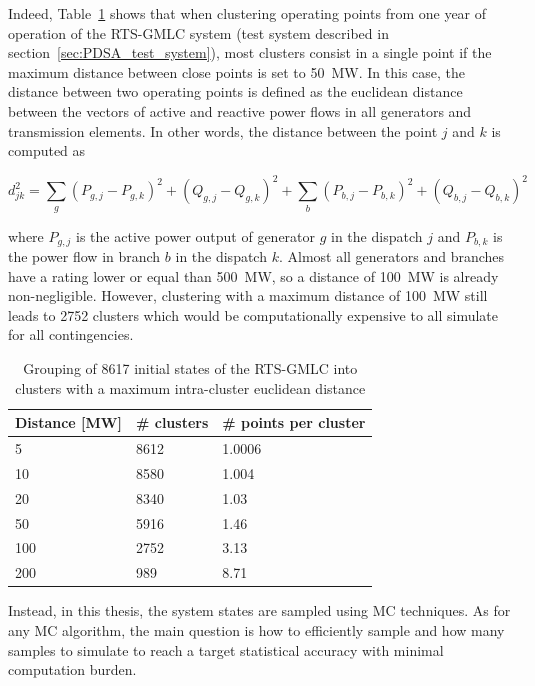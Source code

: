 Indeed, Table~\ref{tab:clustering} shows that when clustering operating points from one year of operation of the RTS-GMLC system (test system described in section~\ref{sec:PDSA_test_system}), most clusters consist in a single point if the maximum distance between close points is set to 50~MW. In this case, the distance between two operating points is defined as the euclidean distance between the vectors of active and reactive power flows in all generators and transmission elements. In other words, the distance between the point \(j\) and \(k\) is computed as

\begin{equation}
d^2_{jk} = \sum_g (P_{g, j} - P_{g, k})^2 + (Q_{g, j} - Q_{g, k})^2 + \sum_b (P_{b, j} - P_{b, k})^2 + (Q_{b, j} - Q_{b, k})^2
\end{equation}

\noindent where \(P_{g, j}\) is the active power output of generator \(g\) in the dispatch \(j\) and \(P_{b, k}\) is the power flow in branch \(b\) in the dispatch \(k\). Almost all generators and branches have a rating lower or equal than 500~MW, so a distance of 100~MW is already non-negligible. However, clustering with a maximum distance of 100~MW still leads to 2752 clusters which would be computationally expensive to all simulate for all contingencies.

\begin{table}
\centering
\caption{Grouping of 8617 initial states of the RTS-GMLC into clusters with a maximum intra-cluster euclidean distance}
\label{tab:clustering}
\begin{tabular}{@{}lll@{}}
\toprule
Distance [MW] & \# clusters & \# points per cluster \\ \midrule
5             & 8612        & 1.0006    \\
10            & 8580        & 1.004     \\
20            & 8340        & 1.03      \\
50            & 5916        & 1.46      \\
100           & 2752        & 3.13      \\
200           & 989         & 8.71      \\ \bottomrule
\end{tabular}
\end{table}

Instead, in this thesis, the system states are sampled using MC techniques. As for any MC algorithm, the main question is how to efficiently sample and how many samples to simulate to reach a target statistical accuracy with minimal computation burden.

